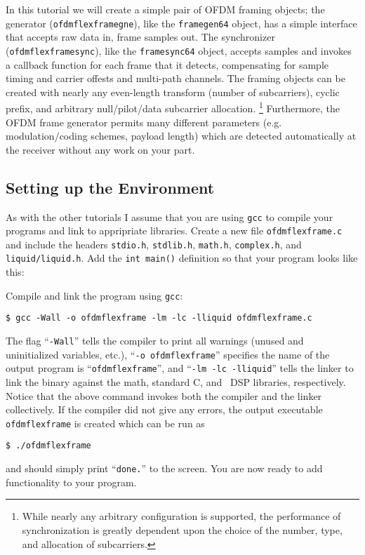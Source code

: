 In this tutorial we will create a simple pair of OFDM framing objects;
the generator ({\tt ofdmflexframegne}),
like the {\tt framegen64} object,
has a simple interface that accepts raw data in, frame samples out.
The synchronizer ({\tt ofdmflexframesync}),
like the {\tt framesync64} object,
accepts samples and invokes a callback function for each frame that it
detects,
compensating for sample timing and carrier offests and multi-path
channels.
The framing objects can be created with nearly any even-length transform
(number of subcarriers),
cyclic prefix, and arbitrary null/pilot/data subcarrier allocation.%
\footnote{While nearly any arbitrary configuration is supported, the
          performance of synchronization is greatly dependent upon the
          choice of the number, type, and allocation of subcarriers.
          }
Furthermore, the OFDM frame generator permits many different parameters
(e.g. modulation/coding schemes, payload length)
which are detected automatically at the receiver without any work on
your part.


%
%
\subsection{Setting up the Environment}
\label{tutorial:ofdmflexframe:environment}

As with the other tutorials I assume that you are using {\tt gcc} to
compile your programs and link to appripriate libraries.
Create a new file {\tt ofdmflexframe.c} and include the headers
{\tt stdio.h},
{\tt stdlib.h},
{\tt math.h},
{\tt complex.h}, and
{\tt liquid/liquid.h}.
Add the {\tt int main()} definition so that your program looks like
this:
%

%
Compile and link the program using {\tt gcc}:
%
\begin{Verbatim}[fontsize=\small]
    $ gcc -Wall -o ofdmflexframe -lm -lc -lliquid ofdmflexframe.c
\end{Verbatim}
%
The flag ``{\tt -Wall}'' tells the compiler to print all warnings
(unused and uninitialized variables, etc.),
``{\tt -o ofdmflexframe}'' specifies the name of the output program is
``{\tt ofdmflexframe}'', and
``{\tt -lm -lc -lliquid}'' tells the linker to link the binary against
the math, standard C, and \liquid\ DSP libraries, respectively.
Notice that the above command invokes both the compiler and the linker
collectively.
%
If the compiler did not give any errors, the output executable
{\tt ofdmflexframe} is created which can be run as
%
\begin{Verbatim}[fontsize=\small]
    $ ./ofdmflexframe
\end{Verbatim}
%
and should simply print ``{\tt done.}'' to the screen.
You are now ready to add functionality to your program.



